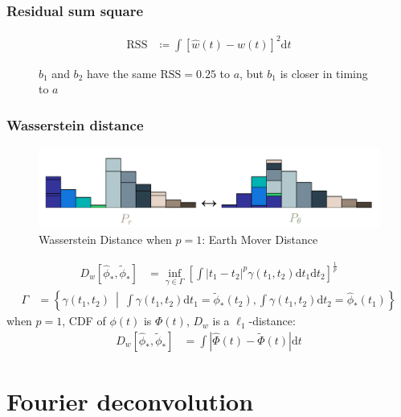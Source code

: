 \documentclass{beamer}
\begin{document}
\begin{CJK*}{UTF8}{gbsn}
\begin{frame}
\frametitle{Residual sum square}
\begin{align*}
  \mathrm{RSS} &\coloneqq \int\left[\hat{w}(t) - w(t)\right]^2\mathrm{d}t
\end{align*}
\begin{figure}
    \centering
    \resizebox{1.0\textwidth}{!}{}
    \caption{$b_1$ and $b_2$ have the same $\mathrm{RSS}=0.25$ to $a$, but $b_1$ is closer in timing to $a$}
\end{figure}
\end{frame}

\begin{frame}
\frametitle{Wasserstein distance}
\begin{figure}
    \centering
    \includegraphics[width=1.0\linewidth]{img/WD.png}
    \caption{Wasserstein Distance when $p=1$: Earth Mover Distance}  
\end{figure}
\begin{align*}
  D_w\left[\hat{\phi}_*, \tilde{\phi}_*\right] &= \inf_{\gamma \in \Gamma} \left[\int \left\vert t_1 - t_2 \right\vert^p \gamma(t_1, t_2)\mathrm{d}t_1\mathrm{d}t_2\right]^{\frac{1}{p}}
\end{align*}
\begin{align*}
  \Gamma &= \left\{\gamma(t_1, t_2) ~\middle\vert~ \int\gamma(t_1,t_2)\mathrm{d}t_1 = \tilde{\phi}_*(t_2) , \int\gamma(t_1,t_2)\mathrm{d}t_2 = \hat{\phi}_*(t_1) \right\}
\end{align*}
when $p=1$, CDF of $\phi(t)$ is $\Phi(t)$, $D_w$ is a $\ell_1$-distance:
\begin{align*}
  D_w\left[\hat{\phi}_*, \tilde{\phi}_*\right] &= \int\left|\hat{\Phi}(t) - \tilde{\Phi}(t)\right| \mathrm{d}t
\end{align*}
\end{frame}

\section{Fourier deconvolution}


\end{CJK*}
\end{document}
